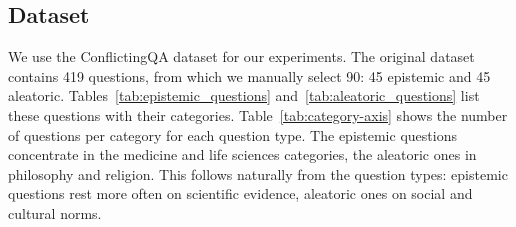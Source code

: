 \subsection{Dataset}
\label{appendix_sub:dataset}
We use the ConflictingQA dataset \citep{wan-etal-2024-evidence} for our experiments. The original dataset contains 419 questions, from which we manually select 90: 45 epistemic and 45 aleatoric. Tables~\ref{tab:epistemic_questions} and~\ref{tab:aleatoric_questions} list these questions with their categories. Table~\ref{tab:category-axis} shows the number of questions per category for each question type. The epistemic questions concentrate in the medicine and life sciences categories, the aleatoric ones in philosophy and religion. This follows naturally from the question types: epistemic questions rest more often on scientific evidence, aleatoric ones on social and cultural norms.

